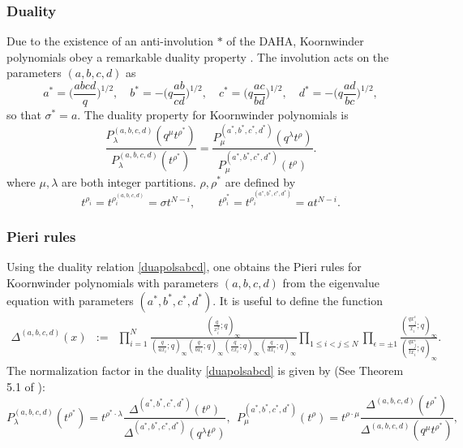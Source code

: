 \documentclass[12pt]{amsart}
\numberwithin{equation}{section}
\begin{document}
\subsubsection{Duality}
\label{secduabcd}
Due to the existence of an anti-involution $*$ of the DAHA,
Koornwinder polynomials obey a remarkable duality property  \cite{vDselfdual,Sahi}. The involution acts on the parameters $(a,b,c,d)$ as 
\begin{equation}
a^*=\Big(\frac{abcd}{q}\Big)^{1/2},\quad
b^*=-\Big(q\frac{ab}{cd}\Big)^{1/2},\quad
c^*=\Big(q\frac{ac}{bd}\Big)^{1/2},\quad
d^*=-\Big(q\frac{ad}{bc}\Big)^{1/2},\label{dua}
\end{equation}
so that $\sigma^*=a$. The duality property for Koornwinder polynomials is 
%
\begin{equation}\label{duapolsabcd}
\frac{P_\lambda^{(a,b,c,d)}(q^\mu t^{\rho^*})}{P^{(a,b,c,d)}_\lambda(t^{\rho^*})}=
\frac{P_\mu^{(a^*,b^*,c^*,d^*)}(q^\lambda t^{\rho})}{P_\mu^{(a^*,b^*,c^*,d^*)}(t^{\rho})}.
\end{equation}
where $\mu,\lambda$ are both integer partitions.
%
%
$\rho,\rho^*$ are defined by
\begin{equation}\label{rhosabcd} 
t^{\rho_i}=t^{\rho^{(a,b,c,d)}_i}=\sigma t^{N-i}, \qquad 
t^{\rho^*_i}=t^{\rho^{(a^*,b^*,c^*,d^*)}_i}=a t^{N-i} .\end{equation}

%
%
%
%
%

\subsubsection{Pieri rules} \label{sec:koorpieri}
Using the duality relation \eqref{duapolsabcd}, one obtains the Pieri rules for Koornwinder polynomials with parameters $(a,b,c,d)$ from the eigenvalue equation with parameters $(a^*,b^*,c^*,d^*)$.
It is useful to define the function
\begin{eqnarray} 
\Delta^{(a,b,c,d)}(x)&:=&\prod_{i=1}^N \frac{(\frac{q}{x_i^2};q)_\infty}{(\frac{q}{a x_i};q)_\infty(\frac{q}{b x_i};q)_\infty (\frac{q}{c x_i};q)_\infty (\frac{q}{d x_i};q)_\infty  }
\prod_{1\leq i < j \leq N} \prod_{\epsilon=\pm1} \frac{(\frac{qx_j^\epsilon}{ x_i};q)_\infty}{(\frac{qx_j^\epsilon}{t  x_i};q)_\infty}.
%
%
%
\label{deltabcd}
\end{eqnarray}
%
The normalization factor in the duality \eqref{duapolsabcd} is given by (See Theorem 5.1 of \cite{vDselfdual}):
\begin{equation}\label{normpolabcd}
P_\lambda^{(a,b,c,d)}(t^{\rho^*})=t^{\rho^*\cdot\lambda}\frac{\Delta^{(a^*,b^*,c^*,d^*)}(t^{\rho})}{\Delta^{(a^*,b^*,c^*,d^*)}(q^\lambda t^{\rho})},\ \ 
P_\mu^{(a^*,b^*,c^*,d^*)}(t^{\rho})=t^{\rho\cdot\mu}\frac{\Delta^{(a,b,c,d)}(t^{\rho^*})}{\Delta^{(a,b,c,d)}(q^\mu t^{\rho^*})},
%
%
\end{equation}
%
%
%
%
\end{document}
